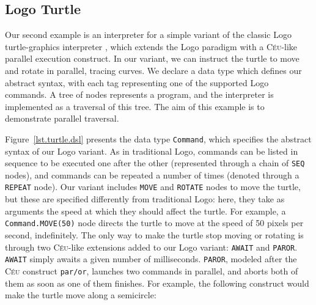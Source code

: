 \documentclass{acm_proc_article-sp}
\newcommand{\CEU}{\textsc{C\'{e}u}\xspace}
\newcommand{\code}[1] {{\small{\texttt{#1}}}}
\begin{document}

\subsection{Logo Turtle}

Our second example is an interpreter for a simple variant of the classic Logo
turtle-graphics interpreter \cite{papert.logo}, which extends the Logo
paradigm with a \CEU-like parallel execution construct. In our variant, we can
instruct the turtle to move and rotate in parallel, tracing curves. We declare
a data type which defines our abstract syntax, with each tag representing one
of the supported Logo commands. A tree of nodes represents a program, and the
interpreter is implemented as a traversal of this tree. The aim of this
example is to demonstrate parallel traversal.

Figure~\ref{lst.turtle.dsl} presents the data type \code{Command}, which
specifies the abstract syntax of our Logo variant. As in traditional Logo,
commands can be listed in sequence to be executed one after the other
(represented through a chain of \code{SEQ} nodes), and commands can be
repeated a number of times (denoted through a \code{REPEAT} node). Our variant
includes \code{MOVE} and \code{ROTATE} nodes to move the turtle, but these are
specified differently from traditional Logo: here, they take as arguments the
speed at which they should affect the turtle. For example, a
\code{Command.MOVE(50)} node directs the turtle to move at the speed of 50
pixels per second, indefinitely. The only way to make the turtle stop moving
or rotating is through two \CEU-like extensions added to our Logo variant:
\code{AWAIT} and \code{PAROR}. \code{AWAIT} simply awaits a given number of
milliseconds. \code{PAROR}, modeled after the \CEU construct \code{par/or},
launches two commands in parallel, and aborts both of them as soon as one of
them finishes. For example, the following construct would make the turtle move
along a semicircle:
\end{document}
